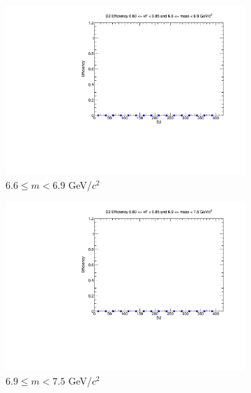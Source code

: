 \begin{figure}[p]
\begin{subfigure}[b]{0.32\textwidth}
        \includegraphics[width=\textwidth]{./kTrackerEfficiencyPlots/D2_Efficiency_xF16_mass8.pdf}
        \caption{$6.6 \leq m < 6.9$ GeV/$c^2$}
        \label{fig:xF16_mass8}
    \end{subfigure}
    \vspace{0.5cm}
    \begin{subfigure}[b]{0.32\textwidth}
        \centering
        \includegraphics[width=\textwidth]{./kTrackerEfficiencyPlots/D2_Efficiency_xF16_mass9.pdf}
        \caption{$6.9 \leq m < 7.5$ GeV/$c^2$}
        \label{fig:xF16_mass9}
    \end{subfigure}
    \hfill
    \begin{subfigure}[b]{0.32\textwidth}
        \centering

\end{subfigure}
\end{figure}
